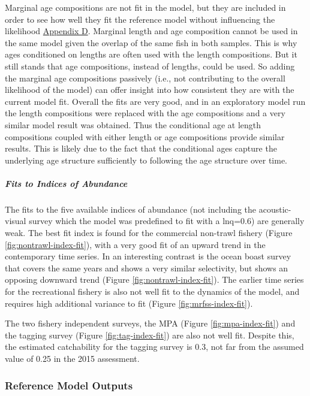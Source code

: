 \documentclass[11pt,
  english,
  letterpaper,
]{article}
\begin{document}
Marginal age compositions are not fit in the model, but they are included in order to see how well they fit the reference model without influencing the likelihood \protect\hyperlink{app_d}{Appendix D}. Marginal length and age composition cannot be used in the same model given the overlap of the same fish in both samples. This is why ages conditioned on lengths are often used with the length compositions. But it still stands that age compositions, instead of lengths, could be used. So adding the marginal age compositions passively (i.e., not contributing to the overall likelihood of the model) can offer insight into how consistent they are with the current model fit. Overall the fits are very good, and in an exploratory model run the length compositions were replaced with the age compositions and a very similar model result was obtained. Thus the conditional age at length compositions coupled with either length or age compositions provide similar results. This is likely due to the fact that the conditional ages capture the underlying age structure sufficiently to following the age structure over time.

\hypertarget{fits-to-indices-of-abundance}{%
\subparagraph{Fits to Indices of Abundance}\label{fits-to-indices-of-abundance}}

The fits to the five available indices of abundance (not including the acoustic-visual survey which the model was predefined to fit with a lnq=0.6) are generally weak. The best fit index is found for the commercial non-trawl fishery (Figure \ref{fig:nontrawl-index-fit}), with a very good fit of an upward trend in the contemporary time series. In an interesting contrast is the ocean boast survey that covers the same years and shows a very similar selectivity, but shows an opposing downward trend (Figure \ref{fig:nontrawl-index-fit}). The earlier time series for the recreational fishery is also not well fit to the dynamics of the model, and requires high additional variance to fit (Figure \ref{fig:mrfss-index-fit}).

The two fishery independent surveys, the MPA (Figure \ref{fig:mpa-index-fit}) and the tagging survey (Figure \ref{fig:tag-index-fit}) are also not well fit. Despite this, the estimated catchability for the tagging survey is 0.3, not far from the assumed value of 0.25 in the 2015 assessment.

\hypertarget{reference-model-outputs}{%
\subsubsection{Reference Model Outputs}\label{reference-model-outputs}}
\end{document}
